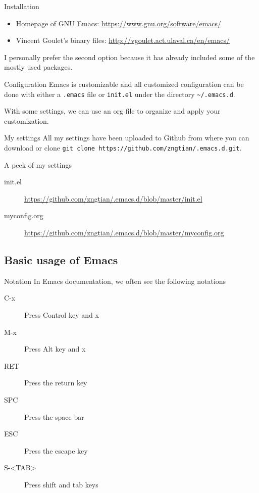 \documentclass[presentation]{beamer}
\begin{document}
\begin{frame}[label={sec:orgabb7179}]{Installation}
\begin{itemize}
\item Homepage of GNU Emacs: \url{https://www.gnu.org/software/emacs/}

\item Vincent Goulet's binary files:
\url{http://vgoulet.act.ulaval.ca/en/emacs/}
\end{itemize}

\begin{NOTES}
I personally prefer the second option because it has already included
some of the mostly used packages.
\end{NOTES}
\end{frame}

\begin{frame}[fragile,label={sec:orgf384717}]{Configuration}
 Emacs is customizable and all customized configuration can be done
with either a \texttt{.emacs} file or \texttt{init.el} under the directory
\texttt{\textasciitilde{}/.emacs.d}.

With some settings, we can use an org file to organize and apply your
customization.
\end{frame}

\begin{frame}[fragile,label={sec:orgf4cd0f7}]{My settings}
 All my settings have been uploaded to Github from where you can
download or clone \texttt{git clone
https://github.com/zngtian/.emacs.d.git}.

\begin{block}{A peek of my settings}
\begin{description}
\item[{init.el}] \url{https://github.com/zngtian/.emacs.d/blob/master/init.el}
\item[{myconfig.org}] \url{https://github.com/zngtian/.emacs.d/blob/master/myconfig.org}
\end{description}
\end{block}
\end{frame}


\subsection*{Basic usage of Emacs}
\label{sec:orgdb65888}

\begin{frame}[label={sec:org30d29c9}]{Notation}
In Emacs documentation, we often see the following notations

\begin{description}
\item[{C-x}] Press Control key and x
\item[{M-x}] Press Alt key and x
\item[{RET}] Press the return key
\item[{SPC}] Press the space bar
\item[{ESC}] Press the escape key
\item[{S-<TAB>}] Press shift and tab keys
\end{description}
\end{frame}
\end{document}
